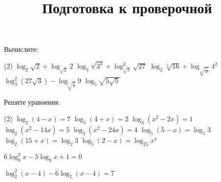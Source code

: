 \begin{class}[number=7]
	\title{Подготовка к проверочной}
	\begin{listofex}
		\item Вычислите:
		\begin{tasks}(2)
			\task \( \log_2 \sqrt{2} + \log_{\sqrt{2}}2 \)
			\task \( \log_3 \sqrt{3^3} + \log^2_{\sqrt{3}}\sqrt{27} \)
			\task \( \log_2 \sqrt[3]{16} + \log_{\sqrt{\frac{1}{16}}}4^{2} \)
			\task \( \log^2_3 (27\sqrt{3}) - \log_{\sqrt{\frac{1}{3}}}9 \)
			\task \( \log_5 \sqrt{5\sqrt{5}} \)
		\end{tasks}
		
		\item Решите уравнения: %
		\begin{tasks}(2)
			\task \( \log_2 (4-x)=7 \)
			\task \( \log_5(4+x)=2 \)
			\task \( \log_3 (x^2-2x)=1 \)
			\task \( \log_2 (x^2-14x)=5 \)
			\task \( \log_3 (x^2-24x)=4 \)
			\task \( \log_5(5-x)=\log_5 3 \)
			\task \( \log_2(15+x)=\log_2 3 \)
			\task \( \log_5 (2-x) = \log_{25} x^4 \)
			
			\task \( 6 \log^2_8 x -5\log_8 x+1=0 \)
			
			
			\task \( \log_2^2 (x-4) -6 \log_2 (x-4) = 7 \)
		\end{tasks}
		
		
		
	\end{listofex}
\end{class}

